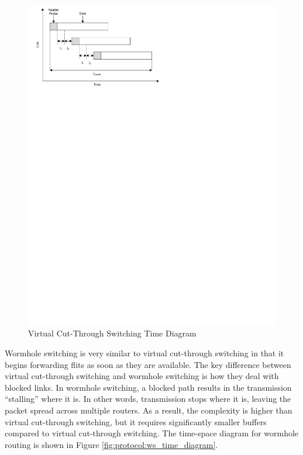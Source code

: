 \begin{figure}[ptb]
	\begin{centering}
		\includegraphics[scale=0.8]{Protocol/Figures/protocol-vcts_time_diagram.pdf}
		\caption[Virtual Cut-Through Switching Time Diagram]{Virtual Cut-Through Switching Time Diagram \cite{ref:1997-duato-interconnection_networks}}
		\label{fig:protocol:vcts_time_diagram}
	\end{centering}
\end{figure}

Wormhole switching is very similar to virtual cut-through switching in that it begins forwarding flits as soon as they are available. The key difference between virtual cut-through switching and wormhole switching is how they deal with blocked links. In wormhole switching, a blocked path results in the transmission ``stalling'' where it is. In other words, transmission stops where it is, leaving the packet spread across multiple routers. As a result, the complexity is higher than virtual cut-through switching, but it requires significantly smaller buffers compared to virtual cut-through switching. The time-space diagram for wormhole routing is shown in Figure \ref{fig:protocol:ws_time_diagram}. \cite{ref:1997-duato-interconnection_networks}

